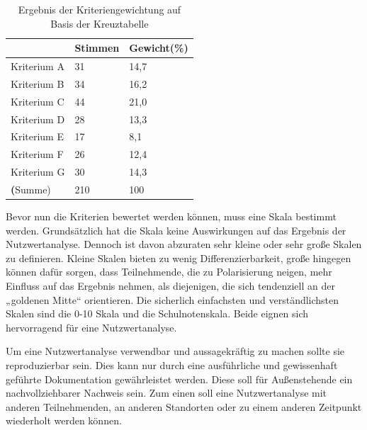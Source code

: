 \begin{table}
	\centering
	\begin{tabular}{l|l|l}
		~              & Stimmen & Gewicht(\%) \\
		\hline \hline
		Kriterium A    & 31      & 14,7        \\
		\hline
		Kriterium B    & 34      & 16,2        \\
		\hline
		Kriterium C    & 44      & 21,0        \\
		\hline
		Kriterium D    & 28      & 13,3        \\
		\hline
		Kriterium E    & 17      & 8,1         \\
		\hline
		Kriterium F    & 26      & 12,4        \\
		\hline
		Kriterium G    & 30      & 14,3        \\
		\hline
		\textbf(Summe) & 210     & 100         \\
		\hline
	\end{tabular}
	\caption[Ergebnis der Kriteriengewichtung auf Basis der Kreuztabelle]{Ergebnis der Kriteriengewichtung auf Basis der Kreuztabelle \footnotemark}
	\label{tab:ErgebnisKreuztabelle}
\end{table}

Bevor nun die Kriterien bewertet werden können, muss eine Skala bestimmt werden. Grundsätzlich hat die Skala keine Auswirkungen auf das Ergebnis der Nutzwertanalyse. Dennoch ist davon abzuraten sehr kleine oder sehr große Skalen zu definieren. Kleine Skalen bieten zu wenig Differenzierbarkeit, große hingegen können dafür sorgen, dass Teilnehmende, die zu Polarisierung neigen, mehr Einfluss auf das Ergebnis nehmen, als diejenigen, die sich tendenziell an der „goldenen Mitte“ orientieren. Die sicherlich einfachsten und verständlichsten Skalen sind die 0-10 Skala und die Schulnotenskala. Beide eignen sich hervorragend für eine Nutzwertanalyse. \footnotemark
{}

Um eine Nutzwertanalyse verwendbar und aussagekräftig zu machen sollte sie reproduzierbar sein. Dies kann nur durch eine ausführliche und gewissenhaft geführte Dokumentation gewährleistet werden. Diese soll für Außenstehende ein nachvollziehbarer Nachweis sein. Zum einen soll eine Nutzwertanalyse mit anderen Teilnehmenden, an anderen Standorten oder zu einem anderen Zeitpunkt wiederholt werden können. \footnotemark
{}


